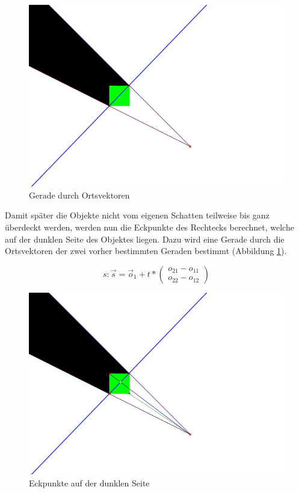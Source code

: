 \begin{figure}[t]
	\centering
	\includegraphics[width=\columnwidth]{images/durchfuehrung_2.png}
	\caption{Gerade durch Ortsvektoren}
	\label{fig:durch4}
\end{figure}

Damit später die Objekte nicht vom eigenen Schatten teilweise bis ganz überdeckt werden, werden nun
die Eckpunkte des Rechtecks berechnet, welche auf der dunklen Seite des Objektes liegen. Dazu wird
eine Gerade durch die Ortsvektoren der zwei vorher bestimmten Geraden bestimmt (Abbildung
\ref{fig:durch4}).

\begin{equation}
	s: \vec{s} = \vec{o}_1 + t * \left(\begin{array}{c} o_21 - o_11 \\ o_22 - o_12 \end{array}\right)
\end{equation}

\begin{figure}[t]
	\centering
	\includegraphics[width=\columnwidth]{images/durchfuehrung_3.png}
	\caption{Eckpunkte auf der dunklen Seite}
	\label{fig:durch5}
\end{figure}

